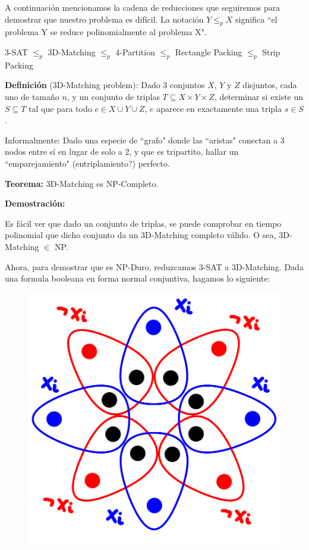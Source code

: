 \documentclass{article}
\begin{document}
A continuación mencionamos la cadena de reducciones que seguiremos para demostrar que nuestro problema es difícil. La notación $Y \leq_p X$ significa ``el problema Y se reduce polinomialmente al problema X".
\bigskip

\small{3-SAT $\leq_p$ 3D-Matching $\leq_p$ 4-Partition $\leq_p$ Rectangle Packing $\leq_p$ Strip Packing}

\bigskip

\textbf{Definición} (3D-Matching problem): Dado 3 conjuntos $X$, $Y$ y $Z$ disjuntos, cada uno de tamaño $n$, y un conjunto de triplas $T \subseteq X \times Y \times Z$, determinar si existe un $S \subseteq T$ tal que para todo $e \in X \cup Y \cup Z$, $e$ aparece en exactamente una tripla $s \in S$.

\smallskip

Informalmente: Dado una especie de ``grafo" donde las ``aristas" conectan a 3 nodos entre sí en lugar de solo a 2, y que es tripartito, hallar un ``emparejamiento" (entriplamiento?) perfecto.

\bigskip
\textbf{Teorema:} 3D-Matching es NP-Completo.

\smallskip

\textbf{Demostración:}

\bigskip

Es fácil ver que dado un conjunto de triplas, se puede comprobar en tiempo polinomial que dicho conjunto da un 3D-Matching completo válido. O sea, 3D-Matching $\in$ NP.

\bigskip

Ahora, para demostrar que es NP-Duro, reduzcamos 3-SAT a 3D-Matching. Dada una formula booleana en forma normal conjuntiva, hagamos lo siguiente:

\begin{figure}[hp]
	\begin{center}
		\includegraphics[scale=0.2]{IMGs/3DM 1.png}	
	\end{center}
\end{figure}
\end{document}
